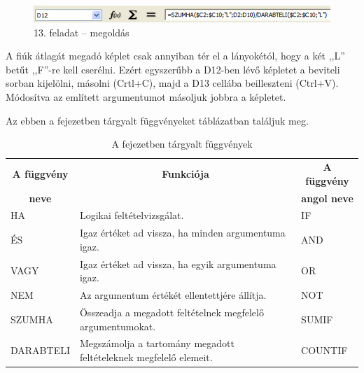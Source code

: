 \begin{figure}[!h]
\begin{center}
\includegraphics[width=12.28cm]{oocalcv2-img76.png}
\caption{13.  feladat -- megoldás}\label{13-feladatMegoldás}
\end{center}
\end{figure}

A fiúk átlagát megadó képlet csak annyiban tér el a
lányokétól, hogy a két
,,L'' betűt
,,F''-re kell cserélni. Ezért
egyszerűbb a D12-ben lévő képletet a beviteli sorban
kijelölni, másolni (Crtl+C), majd a D13 cellába beilleszteni
(Ctrl+V). Módosítva az említett argumentumot másoljuk jobbra a
képletet.

Az ebben a fejezetben tárgyalt függvényeket 
táblázatban találjuk meg.


\begin{table}[!h]
\begin{center}
\caption{A fejezetben tárgyalt függvények}\label{7-fejezetFüggvények}
\begin{tabular}{|m{2.5cm}|m{8cm}|m{3cm}|}
\hline
\multicolumn{1}{|c|}{\textbf{A függvény}}&
\multicolumn{1}{c|}{\textbf{Funkciója}}&
\multicolumn{1}{c|}{\textbf{A függvény}} \\
\multicolumn{1}{|c|}{\textbf{neve}} & &
\multicolumn{1}{c|}{\textbf{angol neve}} \\
\hline
HA & Logikai feltételvizsgálat. & IF\\ \hline
ÉS & Igaz értéket ad vissza, ha minden argumentuma igaz. & AND\\ \hline
VAGY & Igaz értéket ad vissza, ha egyik argumentuma igaz. & OR\\ \hline
NEM & Az argumentum értékét ellentettjére állítja. & NOT\\ \hline
SZUMHA & Összeadja a megadott feltételnek megfelelő
argumentumokat. & SUMIF\\ \hline
DARABTELI & Megszámolja a tartomány megadott feltételeknek
megfelelő elemeit. & COUNTIF\\ \hline
\end{tabular}
\end{center}
\end{table}

